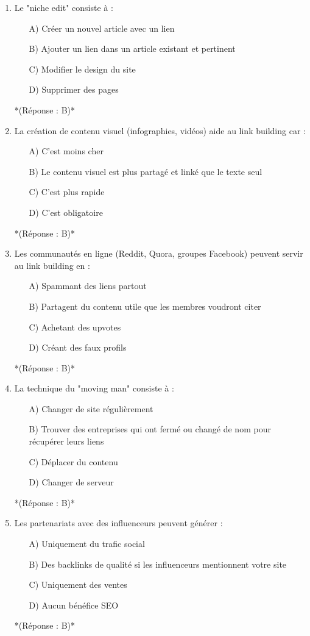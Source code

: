 \documentclass[12pt,a4paper,twoside]{report}
\begin{document}
\begin{enumerate}
\item Le "niche edit" consiste à :
\begin{itemize}
\item[A)] Créer un nouvel article avec un lien
\item[B)] Ajouter un lien dans un article existant et pertinent
\item[C)] Modifier le design du site
\item[D)] Supprimer des pages
\end{itemize}
*(Réponse : B)*

\item La création de contenu visuel (infographies, vidéos) aide au link building car :
\begin{itemize}
\item[A)] C'est moins cher
\item[B)] Le contenu visuel est plus partagé et linké que le texte seul
\item[C)] C'est plus rapide
\item[D)] C'est obligatoire
\end{itemize}
*(Réponse : B)*

\item Les communautés en ligne (Reddit, Quora, groupes Facebook) peuvent servir au link building en :
\begin{itemize}
\item[A)] Spammant des liens partout
\item[B)] Partagent du contenu utile que les membres voudront citer
\item[C)] Achetant des upvotes
\item[D)] Créant des faux profils
\end{itemize}
*(Réponse : B)*

\item La technique du "moving man" consiste à :
\begin{itemize}
\item[A)] Changer de site régulièrement
\item[B)] Trouver des entreprises qui ont fermé ou changé de nom pour récupérer leurs liens
\item[C)] Déplacer du contenu
\item[D)] Changer de serveur
\end{itemize}
*(Réponse : B)*

\item Les partenariats avec des influenceurs peuvent générer :
\begin{itemize}
\item[A)] Uniquement du trafic social
\item[B)] Des backlinks de qualité si les influenceurs mentionnent votre site
\item[C)] Uniquement des ventes
\item[D)] Aucun bénéfice SEO
\end{itemize}
*(Réponse : B)*


\end{enumerate}
\end{document}
